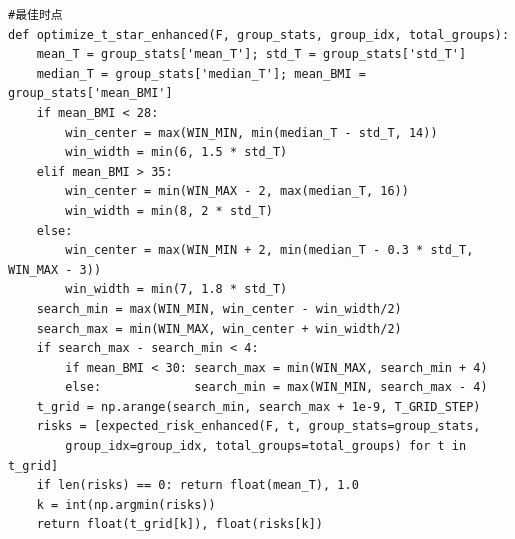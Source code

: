 \begin{lstlisting}
#最佳时点
def optimize_t_star_enhanced(F, group_stats, group_idx, total_groups):
    mean_T = group_stats['mean_T']; std_T = group_stats['std_T']
    median_T = group_stats['median_T']; mean_BMI = group_stats['mean_BMI']
    if mean_BMI < 28:
        win_center = max(WIN_MIN, min(median_T - std_T, 14))
        win_width = min(6, 1.5 * std_T)
    elif mean_BMI > 35:
        win_center = min(WIN_MAX - 2, max(median_T, 16))
        win_width = min(8, 2 * std_T)
    else:
        win_center = max(WIN_MIN + 2, min(median_T - 0.3 * std_T, WIN_MAX - 3))
        win_width = min(7, 1.8 * std_T)
    search_min = max(WIN_MIN, win_center - win_width/2)
    search_max = min(WIN_MAX, win_center + win_width/2)
    if search_max - search_min < 4:
        if mean_BMI < 30: search_max = min(WIN_MAX, search_min + 4)
        else:             search_min = max(WIN_MIN, search_max - 4)
    t_grid = np.arange(search_min, search_max + 1e-9, T_GRID_STEP)
    risks = [expected_risk_enhanced(F, t, group_stats=group_stats,
        group_idx=group_idx, total_groups=total_groups) for t in t_grid]
    if len(risks) == 0: return float(mean_T), 1.0
    k = int(np.argmin(risks))
    return float(t_grid[k]), float(risks[k])

\end{lstlisting}